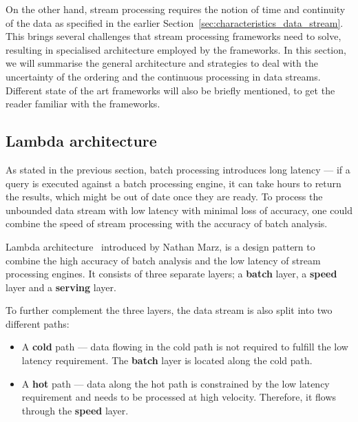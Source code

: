 On the other hand, stream processing requires the notion of time and continuity of the data as 
specified in the earlier Section~\ref{sec:characteristics_data_stream}. This brings several challenges 
that stream processing frameworks need to solve, resulting in specialised architecture employed by the 
frameworks. In this section, we will summarise the general architecture and strategies to deal with the 
uncertainty of the ordering and the continuous processing in data streams. Different 
state of the art frameworks will also be briefly mentioned, to get the reader familiar with the 
frameworks. 

\newpage

\subsection{Lambda architecture}

As stated in the previous section, batch processing introduces long latency --- if a query 
is executed against a batch processing engine, it can take hours to return the results, which might be 
out of date once they are ready. To process the unbounded data stream with low latency with minimal 
loss of accuracy, one could combine the speed of stream processing with the accuracy of batch analysis. 


Lambda architecture~\cite{lambda_arch, lambda_arch_book, lambda_arc_bpost} introduced by Nathan Marz, is a 
design pattern to combine the high accuracy of batch analysis and the low latency of 
stream processing engines. It consists of three separate layers; a \textbf{batch} layer, 
a \textbf{speed} layer and a \textbf{serving} layer. 

To further complement the three layers, 
the data stream is also split into two different paths: 
\begin{itemize}
    \item A \textbf{cold} path --- data flowing in the cold path is not required to fulfill the low
        latency requirement. The \textbf{batch} layer is located along the cold path.   
    \item A \textbf{hot} path --- data along the hot path is constrained by the low latency requirement 
        and needs to be processed at high velocity. Therefore, it flows through the 
        \textbf{speed} layer.  
\end{itemize}

